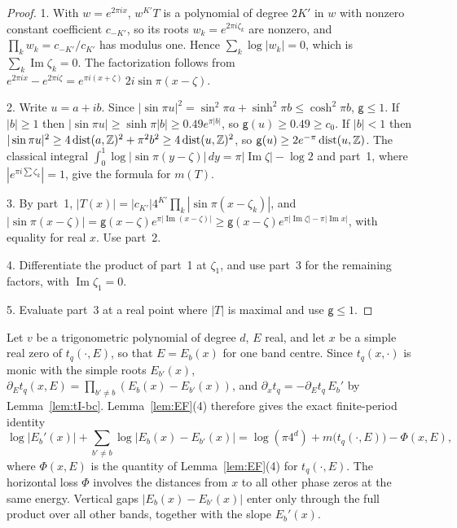 \begin{proof}
1. With $w=e^{2\pi ix}$, $w^{K'}T$ is a polynomial of degree $2K'$ in $w$ with nonzero constant coefficient $c_{-K'}$, so its roots $w_k=e^{2\pi i\zeta_k}$ are nonzero, and $\prod_kw_k=c_{-K'}/c_{K'}$ has modulus one. Hence $\sum_k\log|w_k|=0$, which is $\sum_k\operatorname{Im}\zeta_k=0$. The factorization follows from $e^{2\pi ix}-e^{2\pi i\zeta}=e^{\pi i(x+\zeta)}\,2i\sin\pi(x-\zeta)$.

2. Write $u=a+ib$. Since $|\sin\pi u|^2=\sin^2\pi a+\sinh^2\pi b\le\cosh^2\pi b$, $\mathsf g\le1$. If $|b|\ge1$ then $|\sin\pi u|\ge\sinh\pi|b|\ge0.49e^{\pi|b|}$, so $\mathsf g(u)\ge0.49\ge c_0$. If $|b|<1$ then $|\sin\pi u|^2\ge4\operatorname{dist}(a,\mathbb Z)^2+\pi^2b^2\ge4\operatorname{dist}(u,\mathbb Z)^2$, so $\mathsf g(u)\ge2e^{-\pi}\operatorname{dist}(u,\mathbb Z)$. The classical integral $\int_0^1\log|\sin\pi(y-\zeta)|\,dy=\pi|\operatorname{Im}\zeta|-\log2$ and part~1, where $|e^{\pi i\sum\zeta_k}|=1$, give the formula for $m(T)$.

3. By part~1, $|T(x)|=|c_{K'}|4^{K'}\prod_k|\sin\pi(x-\zeta_k)|$, and $|\sin\pi(x-\zeta)|=\mathsf g(x-\zeta)e^{\pi|\operatorname{Im}(x-\zeta)|}\ge\mathsf g(x-\zeta)e^{\pi|\operatorname{Im}\zeta|-\pi|\operatorname{Im}x|}$, with equality for real $x$. Use part~2.

4. Differentiate the product of part~1 at $\zeta_1$, and use part~3 for the remaining factors, with $\operatorname{Im}\zeta_1=0$.

5. Evaluate part~3 at a real point where $|T|$ is maximal and use $\mathsf g\le1$.
\end{proof}

\begin{remark}\label{rem:bandproduct}
Let $v$ be a trigonometric polynomial of degree $d$, $E$ real, and let $x$ be a simple real zero of $t_q(\cdot,E)$, so that $E=E_b(x)$ for one band centre. Since $t_q(x,\cdot)$ is monic with the simple roots $E_{b'}(x)$, $\partial_Et_q(x,E)=\prod_{b'\ne b}(E_b(x)-E_{b'}(x))$, and $\partial_xt_q=-\partial_Et_q\,E_b'$ by Lemma~\ref{lem:tI-bc}. Lemma~\ref{lem:EF}(4) therefore gives the exact finite-period identity
\[
\log|E_b'(x)|+\sum_{b'\ne b}\log|E_b(x)-E_{b'}(x)|=\log(\pi4^d)+m\bigl(t_q(\cdot,E)\bigr)-\Phi(x,E),
\]
where $\Phi(x,E)$ is the quantity of Lemma~\ref{lem:EF}(4) for $t_q(\cdot,E)$. The horizontal loss $\Phi$ involves the distances from $x$ to all other phase zeros at the same energy. Vertical gaps $|E_b(x)-E_{b'}(x)|$ enter only through the full product over all other bands, together with the slope $E_b'(x)$.
\end{remark}

